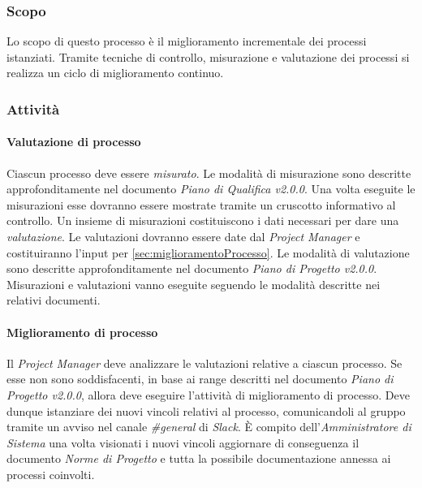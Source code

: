 \subsubsection{Scopo}
Lo scopo di questo processo è il miglioramento incrementale dei processi istanziati. Tramite tecniche di controllo, misurazione e valutazione dei processi si realizza un ciclo di miglioramento continuo.

\subsubsection{Attività}
	\paragraph{Valutazione di processo} \Spazio
	Ciascun processo deve essere \emph{misurato}. Le modalità di misurazione sono descritte approfonditamente nel documento \emph{Piano di Qualifica v2.0.0}. 
	Una volta eseguite le misurazioni esse dovranno essere mostrate tramite un cruscotto informativo al controllo. Un insieme di misurazioni costituiscono i dati necessari per dare una \emph{valutazione}. Le valutazioni dovranno essere date dal \emph{Project Manager} e costituiranno l'input per \ref{sec:miglioramentoProcesso}. Le modalità di valutazione sono descritte approfonditamente nel documento \emph{Piano di Progetto v2.0.0}. Misurazioni e valutazioni vanno eseguite seguendo le modalità descritte nei relativi documenti.

	\paragraph{Miglioramento di processo} \Spazio
	\label{sec:miglioramentoProcesso}
	Il \emph{Project Manager} deve analizzare le valutazioni relative a ciascun processo. Se esse non sono soddisfacenti, in base ai range descritti nel documento \emph{Piano di Progetto v2.0.0}, allora deve eseguire l'attività di miglioramento di processo. Deve dunque istanziare dei nuovi vincoli relativi al processo, comunicandoli al gruppo tramite un avviso nel canale \emph{\#general} di \emph{Slack}. È compito dell'\emph{Amministratore di Sistema} una volta visionati i nuovi vincoli aggiornare di conseguenza il documento \emph{Norme di Progetto} e tutta la possibile documentazione annessa ai processi coinvolti. 
